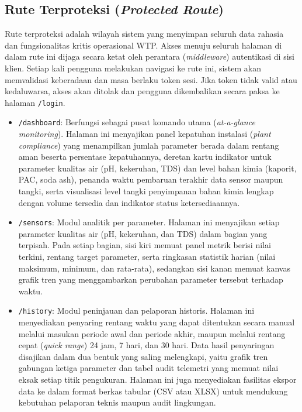 \subsection{Rute Terproteksi (\textit{Protected Route})}
Rute terproteksi adalah wilayah sistem yang menyimpan seluruh data rahasia dan fungsionalitas kritis operasional WTP. 
Akses menuju seluruh halaman di dalam rute ini dijaga secara ketat oleh perantara (\textit{middleware}) autentikasi di sisi klien. 
Setiap kali pengguna melakukan navigasi ke rute ini, sistem akan memvalidasi keberadaan dan masa berlaku token sesi. Jika 
token tidak valid atau kedaluwarsa, akses akan ditolak dan pengguna dikembalikan secara paksa ke halaman \texttt{/login}.
\begin{itemize}
    \item \texttt{/dashboard}: Berfungsi sebagai pusat komando utama (\textit{at-a-glance monitoring}). 
    Halaman ini menyajikan panel kepatuhan instalasi (\textit{plant compliance}) yang menampilkan jumlah parameter 
    berada dalam rentang aman beserta persentase kepatuhannya, deretan kartu indikator untuk parameter kualitas air 
    (pH, kekeruhan, TDS) dan level bahan kimia (kaporit, PAC, soda ash), penanda waktu pembaruan terakhir data sensor 
    maupun tangki, serta visualisasi level tangki penyimpanan bahan kimia lengkap dengan volume tersedia dan indikator 
    status ketersediaannya.
    
    \item \texttt{/sensors}: Modul analitik per parameter. Halaman ini menyajikan setiap parameter kualitas air 
    (pH, kekeruhan, dan TDS) dalam bagian yang terpisah. Pada setiap bagian, sisi kiri memuat panel metrik berisi 
    nilai terkini, rentang target parameter, serta ringkasan statistik harian (nilai maksimum, minimum, dan rata-rata), 
    sedangkan sisi kanan memuat kanvas grafik tren yang menggambarkan perubahan parameter tersebut terhadap waktu.
    
    \item \texttt{/history}: Modul peninjauan dan pelaporan historis. Halaman ini menyediakan penyaring rentang waktu 
    yang dapat ditentukan secara manual melalui masukan periode awal dan periode akhir, maupun melalui rentang cepat 
    (\textit{quick range}) 24 jam, 7 hari, dan 30 hari. Data hasil penyaringan disajikan dalam dua bentuk yang saling 
    melengkapi, yaitu grafik tren gabungan ketiga parameter dan tabel audit telemetri yang memuat nilai eksak setiap 
    titik pengukuran. Halaman ini juga menyediakan fasilitas ekspor data ke dalam format berkas tabular (CSV atau XLSX) 
    untuk mendukung kebutuhan pelaporan teknis maupun audit lingkungan.
    

\end{itemize}
